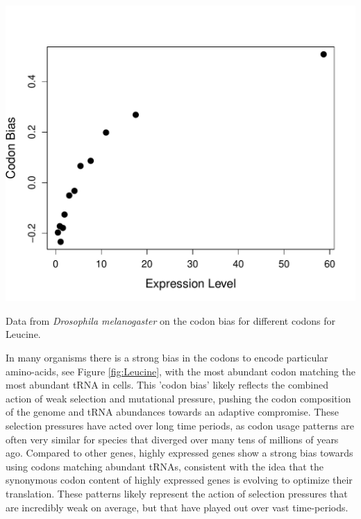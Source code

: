 {\begin{marginfigure}
\begin{center}
\includegraphics[width=\textwidth]{Journal_figs/drift_selection/Codon_bias_Drosophila/Drosophila_codon_bias_expression.pdf}
\end{center}
\caption{Data from {\it Drosophila melanogaster} on the codon bias for
  different codons for Leucine.} \label{fig:Leucine}
\end{marginfigure}
In many organisms there is a strong bias in the codons to encode
particular amino-acids, see Figure \ref{fig:Leucine}, with the most
abundant codon matching the most abundant tRNA in cells. This 'codon bias' likely reflects the combined action of weak selection and
mutational pressure, pushing the codon composition of the genome and tRNA abundances towards an adaptive compromise. These selection
pressures have acted over long time periods, as codon usage patterns
are often very similar for species that diverged over many tens of millions of years ago. 
Compared to other genes, highly expressed genes show a strong bias towards using
codons matching abundant tRNAs, consistent with the idea that the synonymous codon content of
highly expressed genes is evolving to optimize their
translation. These patterns likely represent the action of
selection pressures that are incredibly weak on average, but that have played out
over vast time-periods. 




}
